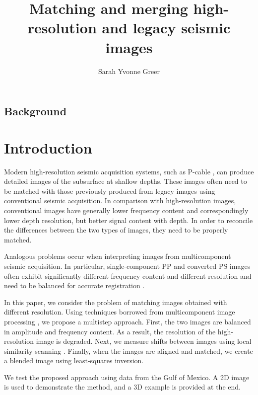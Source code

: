 \title{Matching and merging high-resolution and legacy seismic images}
\author{Sarah Yvonne Greer}
\maketitle

\subsection{Background}


\section{Introduction}

Modern high-resolution seismic acquisition systems, such as P-cable
\cite[]{pcable,tip}, can produce detailed images of the subsurface at
shallow depths. These images often need to be matched with those
previously produced from legacy images using conventional seismic acquisition. In
comparison with high-resolution images, conventional images have
generally lower frequency content and correspondingly lower depth
resolution, but better signal content with depth. In order to reconcile the
differences between the two types of images, they need to be
properly matched.

Analogous problems occur when interpreting images from multicomponent
seismic acquisition. In particular, single-component
PP and converted PS images often exhibit significantly different frequency content
and different resolution and need to be balanced for accurate registration
\cite[]{hardage,SEG-2003-07810784,warp}.

In this paper, we consider the problem of matching images obtained
with different resolution. Using techniques borrowed from
multicomponent image processing \cite[]{warp}, we propose a multistep
approach. First, the two images are balanced in amplitude and
frequency content. As a result, the resolution of the
high-resolution image is degraded. Next, we measure shifts between
images using local similarity
scanning \cite[]{attr,timelapse}. Finally, when the images are aligned and 
matched, we create a blended image using least-squares inversion.

We test the proposed approach using data from the Gulf of Mexico. 
A 2D image is used to demonstrate the method, and a 3D
example is provided at the end.


